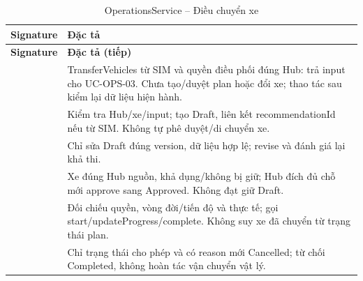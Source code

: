 \begin{longtable}{|L{58mm}|L{81mm}|}
\caption{OperationsService -- Điều chuyển xe}\\\hline
\textbf{Signature} & \textbf{Đặc tả}\\\hline
\endfirsthead
\hline\textbf{Signature} & \textbf{Đặc tả (tiếp)}\\\hline\endhead
{} &
TransferVehicles từ SIM và quyền điều phối đúng Hub: trả input cho UC-OPS-03. Chưa tạo/duyệt plan hoặc đổi xe; thao tác sau kiểm lại dữ liệu hiện hành.\\\hline
{} &
Kiểm tra Hub/xe/input; tạo Draft, liên kết recommendationId nếu từ SIM. Không tự phê duyệt/di chuyển xe.\\\hline
{} &
Chỉ sửa Draft đúng version, dữ liệu hợp lệ; revise và đánh giá lại khả thi.\\\hline
{} &
Xe đúng Hub nguồn, khả dụng/không bị giữ; Hub đích đủ chỗ mới approve sang Approved. Không đạt giữ Draft.\\\hline
{} &
Đối chiếu quyền, vòng đời/tiến độ và thực tế; gọi start/updateProgress/complete. Không suy xe đã chuyển từ trạng thái plan.\\\hline
{} &
Chỉ trạng thái cho phép và có reason mới Cancelled; từ chối Completed, không hoàn tác vận chuyển vật lý.\\\hline
\end{longtable}

